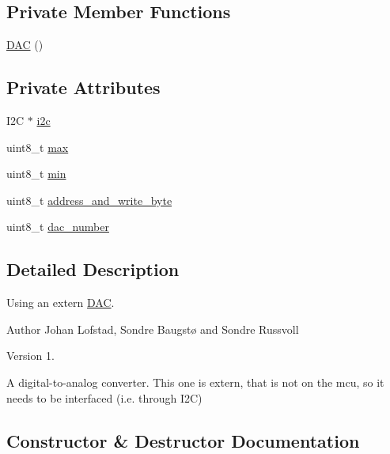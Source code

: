 \subsection*{Private Member Functions}
\begin{DoxyCompactItemize}
\item 
\hyperlink{class_d_a_c_a9908e07a5c096380eeb4c4061d58476d}{D\+AC} ()
\end{DoxyCompactItemize}
\subsection*{Private Attributes}
\begin{DoxyCompactItemize}
\item 
I2C $\ast$ \hyperlink{class_d_a_c_a70a9fd9603ee9fd9303628bd23338bf5}{i2c}
\item 
uint8\+\_\+t \hyperlink{class_d_a_c_a229a81d8ebf43511dfb6815c5cd8f425}{max}
\item 
uint8\+\_\+t \hyperlink{class_d_a_c_aa4f21cf166374cfc6edcd412f4d2072b}{min}
\item 
uint8\+\_\+t \hyperlink{class_d_a_c_a1dd1e9c4a63f493da44d7208e59cc83e}{address\+\_\+and\+\_\+write\+\_\+byte}
\item 
uint8\+\_\+t \hyperlink{class_d_a_c_afb39aacc3401c892403c477f857504f8}{dac\+\_\+number}
\end{DoxyCompactItemize}


\subsection{Detailed Description}
Using an extern \hyperlink{class_d_a_c}{D\+AC}. 

\begin{DoxyAuthor}{Author}
Johan Lofstad, Sondre Baugstø and Sondre Russvoll 
\end{DoxyAuthor}
\begin{DoxyVersion}{Version}
1.
\end{DoxyVersion}
A digital-\/to-\/analog converter. This one is extern, that is not on the mcu, so it needs to be interfaced (i.\+e. through I2C) 

\subsection{Constructor \& Destructor Documentation}
\hypertarget{class_d_a_c_a9908e07a5c096380eeb4c4061d58476d}{}\label{class_d_a_c_a9908e07a5c096380eeb4c4061d58476d} 
